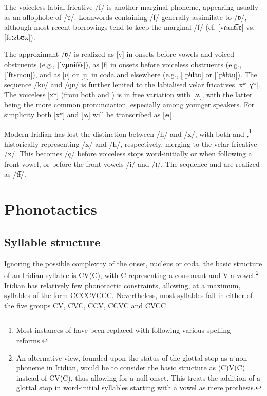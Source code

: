 The voiceless labial fricative /f/ is another marginal phoneme, appearing
usually as an allophobe of /ʋ/. Loanwords containing /f/ generally assimilate to
/ʋ/, although most recent borrowings tend to keep the marginal /f/ (cf.
 [vɾant͡sɐ] vs.  [feːzbʊx]).

The approximant /ʋ/ is realized as [v] in onsets before vowels and voiced
obstruents (e.g.,  [ˈvɟɪnɨt͡sɛ]), as [f] in
onsets before voiceless obstruents (e.g.,  [ˈftɛɾnou̯]),
and as [ʋ] or [u̯] in coda and elsewhere (e.g.,  [ˈpʲɪɫäʋ]
or [ˈpʲɪɫäu̯]). The sequence /kʋ/ and /ɡʋ/ is further lenited to the labialised
velar fricatives [xʷ~ɣʷ]. The voiceless [xʷ] (from both  and )
is in free variation with [ʍ], with the latter being the more common
pronunciation, especially among younger speakers. For simplicity both [xʷ] and
[ʍ] will be transcribed as [ʍ].

Modern Iridian has lost the distinction between /h/ and /x/, with both 
and ,\footnote{Most instances of  have been replaced with
 following various spelling reforms.} historically representing /x/ and
/h/, respectively, merging to the velar fricative /x/. This becomes /ç/ before
voiceless stops word-initially or when following a front vowel, or before the
front vowels /i/ and /ɪ/. The sequence  and  are realized as
/t͡ɬ/.

\section{Phonotactics}\label{sec:phonotactics}

\subsection{Syllable structure}\label{sec:syllable-structure}

Ignoring the possible complexity of the onset, nucleus or coda, the basic
structure of an Iridian syllable is CV(C), with C representing a consonant and V
a vowel.\footnote{An alternative view, founded upon the status of the glottal
stop as a non-phoneme in Iridian, would be to consider the basic structure as
(C)V(C) instead of CV(C), thus allowing for a null onset. This treats the
addition of a glottal stop in word-initial syllables starting with a vowel as
mere prothesis.} Iridian has relatively few phonotactic constraints, allowing,
at a maximum, syllables of the form CCCCVCCC. Nevertheless, most syllables fall
in either of the five groups CV, CVC, CCV, CCVC and CVCC

